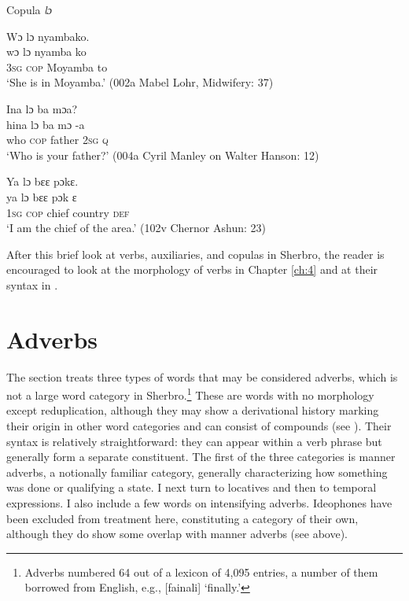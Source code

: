 \ea%
    \label{ex:96}
Copula \textit{lɔ}

\ea Wɔ lɔ nyambako.\\
\gll wɔ    lɔ    nyamba    ko\\
\textsc{3sg}  \textsc{cop}  Moyamba  to\\
\glt ‘She is in Moyamba.' (002a Mabel Lohr, Midwifery: 37)

\ex Ina lɔ ba mɔa?\\
\gll hina  lɔ    ba      mɔ  {}-a\\
who  \textsc{cop}  father    \textsc{2sg}  \textsc{q}\\
\glt ‘Who is your father?' (004a Cyril Manley on Walter Hanson: 12)

\ex  Ya lɔ bɛɛ pɔkɛ.\\
\gll ya      lɔ    bɛɛ    pɔk    ɛ\\
\textsc{1sg}    \textsc{cop}  chief    country  \textsc{def}\\
\glt ‘I am the chief of the area.' (102v Chernor Ashun: 23)
\z
\z

After this brief look at verbs, auxiliaries, and copulas in Sherbro, the reader is encouraged to look at the morphology of verbs in Chapter \ref{ch:4} and at their syntax in .

\section{Adverbs}\label{3.10}
\hypertarget{Toc115517774}{}
The section treats three types of words that may be considered adverbs, which is not a large word category in Sherbro.\footnote{Adverbs numbered 64 out of a lexicon of 4,095 entries, a number of them borrowed from English, e.g., [fainali] ‘finally.'} These are words with no morphology except reduplication, although they may show a derivational history marking their origin in other word categories and can consist of compounds (see ). Their syntax is relatively straightforward: they can appear within a verb phrase but generally form a separate constituent. The first of the three categories is manner adverbs, a notionally familiar category, generally characterizing how something was done or qualifying a state. I next turn to locatives and then to temporal expressions. I also include a few words on intensifying adverbs. Ideophones have been excluded from treatment here, constituting a category of their own, although they do show some overlap with manner adverbs (see  above).


